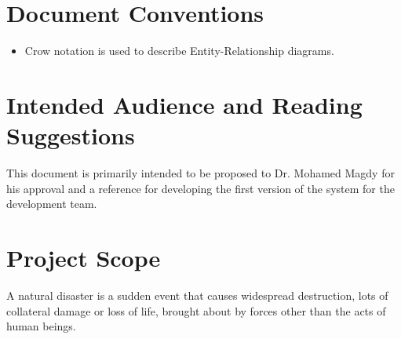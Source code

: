 \documentclass{scrreprt}
\begin{document}
\section{Document Conventions}

\begin{itemize}
    \item Crow notation is used to describe Entity-Relationship diagrams.
\end{itemize}

\section{Intended Audience and Reading Suggestions}

This document is primarily intended to be proposed to Dr. Mohamed Magdy for his approval and a reference for developing the first version of the system for the development team.
\section{Project Scope}

A natural disaster is a sudden event that causes widespread destruction, lots of collateral damage or loss of life, brought about by forces other than the acts of human beings.
\end{document}

